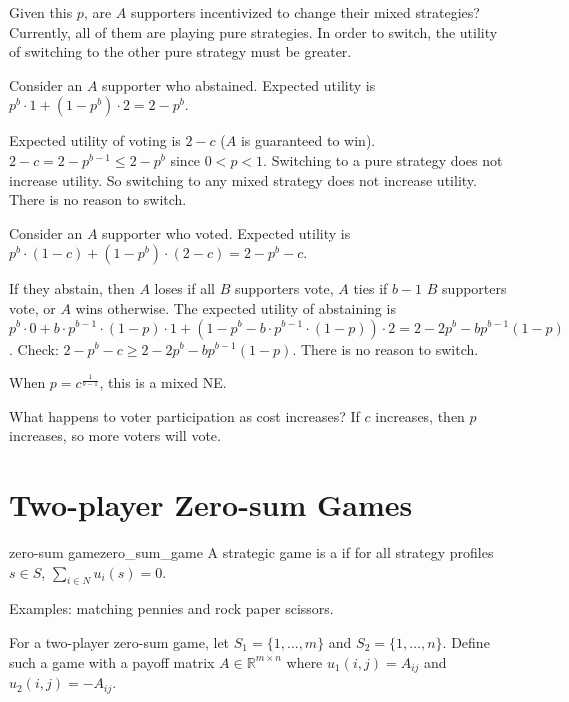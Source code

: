 \documentclass[12pt,letterpaper]{report}
\begin{document}
Given this $p$, are $A$ supporters incentivized to change their mixed strategies?
Currently, all of them are playing pure strategies.
In order to switch, the utility of switching to the other pure strategy must be greater.

\begin{enumcase}
  \item
  Consider an $A$ supporter who abstained.
  Expected utility is $p^b \cdot 1 + (1 - p^b) \cdot 2 = 2 - p^b$.

  Expected utility of voting is $2 - c$ ($A$ is guaranteed to win).
  $2 - c = 2 - p^{b - 1} \leq 2 - p^b$ since $0 < p < 1$.
  Switching to a pure strategy does not increase utility.
  So switching to any mixed strategy does not increase utility.
  There is no reason to switch.
  \item
  Consider an $A$ supporter who voted.
  Expected utility is $p^b \cdot (1 - c) + (1 - p^b) \cdot (2 - c) = 2 - p^b - c$.

  If they abstain, then $A$ loses if all $B$ supporters vote, $A$ ties if $b - 1$ $B$ supporters
  vote, or $A$ wins otherwise.
  The expected utility of abstaining is $p^b \cdot 0 + b \cdot p^{b - 1} \cdot (1 - p) \cdot 1 +
    (1 - p^b - b \cdot p^{b - 1} \cdot (1 - p)) \cdot 2 = 2 - 2p^b - b p^{b - 1} (1 - p)$.
  Check: $2 - p^b - c \geq 2 - 2p^b - b p^{b - 1} (1 - p)$.
  There is no reason to switch.
\end{enumcase}

When $p = c^{\frac{1}{b - 1}}$, this is a mixed NE.

What happens to voter participation as cost increases?
If $c$ increases, then $p$ increases, so more voters will vote.

\section{Two-player Zero-sum Games}

\begin{defn}{zero-sum game}{zero_sum_game}
  A strategic game is a  if for all strategy profiles $s \in S$,
  $\sum\limits_{i \in N} u_i(s) = 0$.
\end{defn}

Examples: matching pennies and rock paper scissors.

For a two-player zero-sum game, let $S_1 = \{ 1, \ldots, m \}$ and $S_2 = \{ 1, \ldots, n \}$.
Define such a game with a payoff matrix $A \in \mathbb{R}^{m \times n}$ where $u_1(i, j) = A_{ij}$
and $u_2(i, j) = -A_{ij}$.
\end{document}
